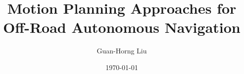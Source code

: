 \documentclass[hidelinks, 12pt]{cmuthesis}
\begin{document}
 
\frontmatter

\pagestyle{empty}

\title{ %
{\bf Motion Planning Approaches for Off-Road Autonomous Navigation}}
\author{Guan-Horng Liu}
\date{\today}
\trnumber{}


\support{}
\disclaimer{}



\maketitle



\pagestyle{plain} %
\end{document}
